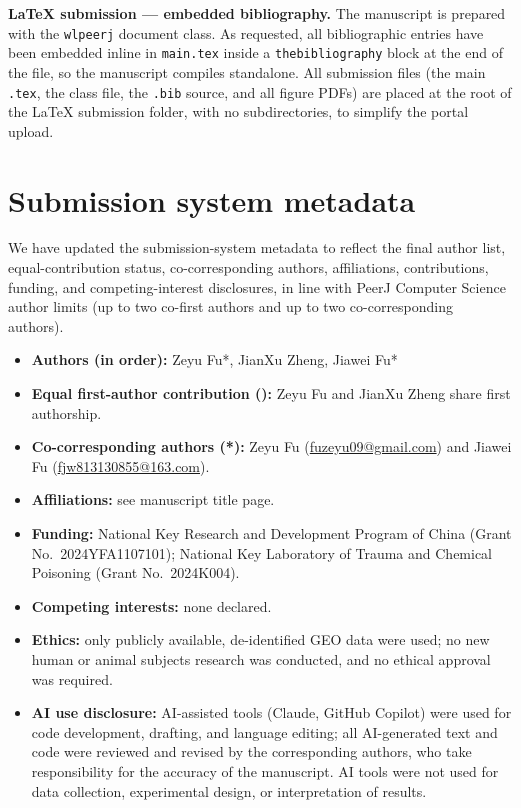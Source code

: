 \documentclass[11pt,letterpaper]{article}
\begin{document}
\noindent\textbf{LaTeX submission --- embedded bibliography.} The manuscript is prepared with the \texttt{wlpeerj} document class. As requested, all bibliographic entries have been embedded inline in \texttt{main.tex} inside a \texttt{thebibliography} block at the end of the file, so the manuscript compiles standalone. All submission files (the main \texttt{.tex}, the class file, the \texttt{.bib} source, and all figure PDFs) are placed at the root of the LaTeX submission folder, with no subdirectories, to simplify the portal upload.

\section*{Submission system metadata}

We have updated the submission-system metadata to reflect the final author list, equal-contribution status, co-corresponding authors, affiliations, contributions, funding, and competing-interest disclosures, in line with PeerJ Computer Science author limits (up to two co-first authors and up to two co-corresponding authors).

\begin{itemize}
  \item \textbf{Authors (in order):} Zeyu Fu*\textdagger, JianXu Zheng\textdagger, Jiawei Fu*
  \item \textbf{Equal first-author contribution (\textdagger):} Zeyu Fu and JianXu Zheng share first authorship.
  \item \textbf{Co-corresponding authors (*):} Zeyu Fu (\href{mailto:fuzeyu09@gmail.com}{fuzeyu09@gmail.com}) and Jiawei Fu (\href{mailto:fjw813130855@163.com}{fjw813130855@163.com}).
  \item \textbf{Affiliations:} see manuscript title page.
  \item \textbf{Funding:} National Key Research and Development Program of China (Grant No.~2024YFA1107101); National Key Laboratory of Trauma and Chemical Poisoning (Grant No.~2024K004).
  \item \textbf{Competing interests:} none declared.
  \item \textbf{Ethics:} only publicly available, de-identified GEO data were used; no new human or animal subjects research was conducted, and no ethical approval was required.
  \item \textbf{AI use disclosure:} AI-assisted tools (Claude, GitHub Copilot) were used for code development, drafting, and language editing; all AI-generated text and code were reviewed and revised by the corresponding authors, who take responsibility for the accuracy of the manuscript. AI tools were not used for data collection, experimental design, or interpretation of results.
\end{itemize}
\end{document}
